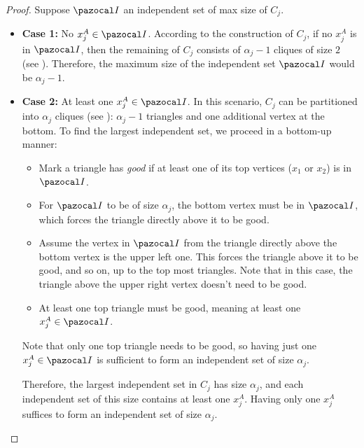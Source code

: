 \begin{proof}
    Suppose $\I$ an independent set of max size of $C_j$.
    \begin{itemize}
        \item \textbf{Case 1:} No $x_j^A \in \I$. According to the construction of $C_j$, if no $x_j^A$ is in $\I$, then the remaining of $C_j$ consists of $\alpha_j - 1$ cliques of size $2$ (see ). Therefore, the maximum size of the independent set $\I$ would be $\alpha_j - 1$.
        \item \textbf{Case 2:} At least one $x_j^A \in \I$. In this scenario, $C_j$ can be partitioned into $\alpha_j$ cliques (see ): $\alpha_j - 1$ triangles and one additional vertex at the bottom. To find the largest independent set, we proceed in a bottom-up manner:
        \begin{itemize}
            \item Mark a triangle has \textit{good} if at least one of its top vertices ($x_1$ or $x_2$) is in $\I$.
            \item For $\I$ to be of size $\alpha_j$, the bottom vertex must be in $\I$, which forces the triangle directly above it to be good.
            \item Assume the vertex in $\I$ from the triangle directly above the bottom vertex is the upper left one. This forces the triangle above it to be good, and so on, up to the top most triangles. Note that in this case, the triangle above the upper right vertex doesn't need to be good.
            \item At least one top triangle must be good, meaning at least one $x_j^A \in \I$.
        \end{itemize}
        
        \medskip
        
        Note that only one top triangle needs to be good, so having just one $x_j^A \in \I$ is sufficient to form an independent set of size $\alpha_j$.
        
        \medskip

        Therefore, the largest independent set in $C_j$ has size $\alpha_j$, and each independent set of this size contains at least one $x_j^A$. Having only one $x_j^A$ suffices to form an independent set of size $\alpha_j$.
    \end{itemize}
\end{proof}



